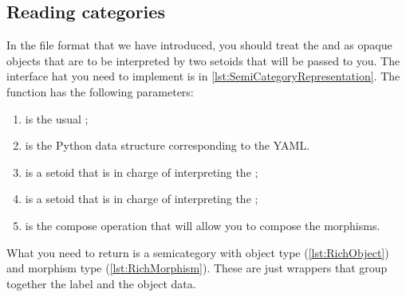 \seprule
{}
\seprule
{}

\seprule



\subsection{Reading categories}

In the file format that we have introduced, you should treat the  and  as opaque objects that are to be interpreted by two setoids that will be passed to you. 
The interface hat you need to implement is in \cref{lst:SemiCategoryRepresentation}. 
The function  has the following parameters:
\begin{enumerate}
    \item {} is the usual ;
    \item {} is the Python data structure corresponding to the YAML.
    \item {} is a setoid that is in charge of interpreting the ;
    \item {} is a setoid that is in charge of interpreting the ;
    \item {} is the compose operation that will allow you to compose the morphisms.
\end{enumerate}
What you need to return is a semicategory with object type  (\cref{lst:RichObject}) and morphism type  (\cref{lst:RichMorphism}). These are just wrappers that group together the label and the object data.

